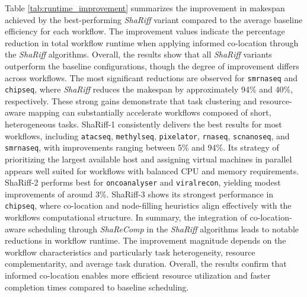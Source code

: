 \noindent
Table \ref{tab:runtime_improvement} summarizes the improvement in makespan achieved by the best-performing \textit{ShaRiff} variant compared to the average baseline efficiency for each workflow. The improvement values indicate the percentage reduction in total workflow runtime when applying informed co-location through the \textit{ShaRiff} algorithms.
Overall, the results show that all \textit{ShaRiff} variants outperform the baseline configurations, though the degree of improvement differs across workflows. The most significant reductions are observed for \texttt{smrnaseq} and \texttt{chipseq}, where \textit{ShaRiff} reduces the makespan by approximately 94\% and 40\%, respectively. These strong gains demonstrate that task clustering and resource-aware mapping can substantially accelerate workflows composed of short, heterogeneous tasks.
ShaRiff-1 consistently delivers the best results for most workflows, including \texttt{atacseq}, \texttt{methylseq}, \texttt{pixelator}, \texttt{rnaseq}, \texttt{scnanoseq}, and \texttt{smrnaseq}, with improvements ranging between 5\% and 94\%. Its strategy of prioritizing the largest available host and assigning virtual machines in parallel appears well suited for workflows with balanced CPU and memory requirements. ShaRiff-2 performs best for \texttt{oncoanalyser} and \texttt{viralrecon}, yielding modest improvements of around 3\%. ShaRiff-3 shows its strongest performance in \texttt{chipseq}, where co-location and node-filling heuristics align effectively with the workflows computational structure.
In summary, the integration of co-location-aware scheduling through \textit{ShaReComp} in the \textit{ShaRiff} algorithms leads to notable reductions in workflow runtime. The improvement magnitude depends on the workflow characteristics and particularly task heterogeneity, resource complementarity, and average task duration. Overall, the results confirm that informed co-location enables more efficient resource utilization and faster completion times compared to baseline scheduling.

